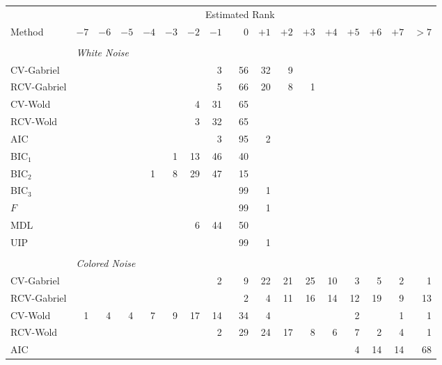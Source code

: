 \begin{table}\label{T:rank-est-weak-gauss}
    \tiny
    \centering    
    \begin{tabular}{lrrrrrrrrrrrrrrrr}
        \toprule
        &\multicolumn{15}{c}{\scriptsize{Estimated Rank}} \\
        \cmidrule{2-17}
        \scriptsize{Method}
            & $-7$ & $-6$ & $-5$ & $-4$ & $-3$ & $-2$ & $-1$ 
            & $\phantom{+}0$ 
            & $+1$ & $+2$ & $+3$ & $+4$ & $+5$ & $+6$ & $+7$ & $> 7$ \\
        \midrule
        \\
        &\multicolumn{16}{l}{\scriptsize{\textit{White Noise}}} \\
 CV-Gabriel &  &  &  &  &  &  &  3 &  56 &  32 &  9 &  &  &  &  &  & \\ 
 RCV-Gabriel &  &  &  &  &  &  &  5 &  66 &  20 &  8 &  1 &  &  &  &  & \\ 
 CV-Wold &  &  &  &  &  &  4 &  31 &  65 &  &  &  &  &  &  &  & \\ 
 RCV-Wold &  &  &  &  &  &  3 &  32 &  65 &  &  &  &  &  &  &  & \\ 
 AIC &  &  &  &  &  &  &  3 &  95 &  2 &  &  &  &  &  &  & \\ 
 BIC$_1$ &  &  &  &  &  1 &  13 &  46 &  40 &  &  &  &  &  &  &  & \\ 
 BIC$_2$ &  &  &  &  1 &  8 &  29 &  47 &  15 &  &  &  &  &  &  &  & \\ 
 BIC$_3$ &  &  &  &  &  &  &  &  99 &  1 &  &  &  &  &  &  & \\ 
 $F$ &  &  &  &  &  &  &  &  99 &  1 &  &  &  &  &  &  & \\ 
 MDL &  &  &  &  &  &  6 &  44 &  50 &  &  &  &  &  &  &  & \\ 
 UIP &  &  &  &  &  &  &  &  99 &  1 &  &  &  &  &  &  & \\ 
         \\
        &\multicolumn{16}{l}{\scriptsize{\textit{Colored Noise}}} \\
CV-Gabriel &  &  &  &  &  &  &  2 &  9 &  22 &  21 &  25 &  10 &  3 &  5 &  2 &  1\\ 
 RCV-Gabriel &  &  &  &  &  &  &  &  2 &  4 &  11 &  16 &  14 &  12 &  19 &  9 &  13\\ 
 CV-Wold &  1 &  4 &  4 &  7 &  9 &  17 &  14 &  34 &  4 &  &  &  &  2 &  &  1 &  1\\ 
 RCV-Wold &  &  &  &  &  &  &  2 &  29 &  24 &  17 &  8 &  6 &  7 &  2 &  4 &  1\\ 
 AIC &  &  &  &  &  &  &  &  &  &  &  &  &  4 &  14 &  14 &  68\\ 

\end{tabular}
\end{table}
